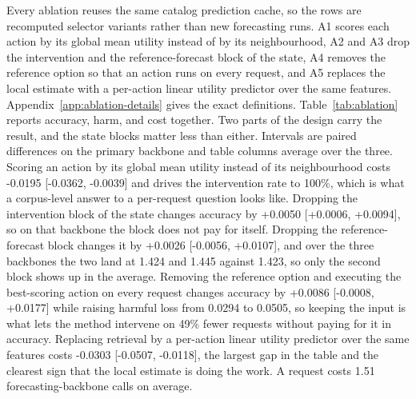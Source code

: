 \documentclass{article}
\begin{document}
Every ablation reuses the same catalog prediction cache, so the rows are recomputed selector
variants rather than new forecasting runs. A1 scores each action by its global mean utility
instead of by its neighbourhood, A2 and A3 drop the intervention and the reference-forecast
block of the state, A4 removes the reference option so that an action runs on every request,
and A5 replaces the local estimate with a per-action linear utility predictor over the same
features. Appendix~\ref{app:ablation-details} gives the exact definitions.
Table~\ref{tab:ablation} reports accuracy, harm, and cost together. Two parts of the design carry the result, and the state blocks matter less than either. Intervals are paired differences on the primary backbone and table columns average over the three. Scoring an action by its global mean utility instead of its neighbourhood costs -0.0195 [-0.0362, -0.0039] and drives the intervention rate to 100\%, which is what a corpus-level answer to a per-request question looks like. Dropping the intervention block of the state changes accuracy by +0.0050 [+0.0006, +0.0094], so on that backbone the block does not pay for itself. Dropping the reference-forecast block changes it by +0.0026 [-0.0056, +0.0107], and over the three backbones the two land at 1.424 and 1.445 against 1.423, so only the second block shows up in the average.
Removing the reference option and executing the best-scoring action on every request changes accuracy by +0.0086 [-0.0008, +0.0177] while raising harmful loss from 0.0294 to 0.0505, so keeping the input is what lets the method intervene on 49\% fewer requests without paying for it in accuracy. Replacing retrieval by a per-action linear utility predictor over the same features costs -0.0303 [-0.0507, -0.0118], the largest gap in the table and the clearest sign that the local estimate is doing the work. A request costs 1.51 forecasting-backbone calls on average.
\end{document}
